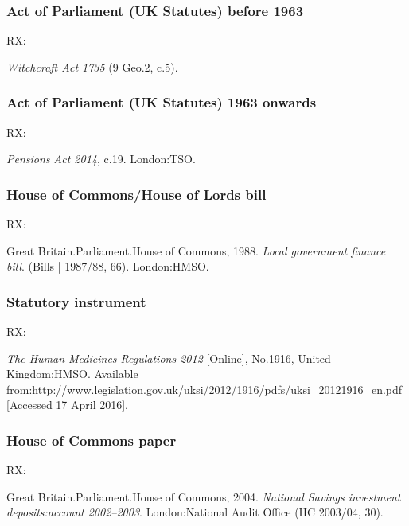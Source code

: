 
\subsubsection*{Act of Parliament (UK Statutes) before 1963}

RX: \cite{gb.wa1735}

\emph{Witchcraft Act 1735} (9 Geo.2, c.5).



\subsubsection*{Act of Parliament (UK Statutes) 1963 onwards}

RX: \cite{gb.pa2014}

\emph{Pensions Act 2014}, c.19. London:\@ TSO.



\subsubsection*{House of Commons/House of Lords bill}

RX: \cite{gb.bill1987/88-66}

Great Britain.\@ Parliament.\@ House of Commons, 1988. \emph{Local government finance bill}. (Bills | 1987/88, 66). London:\@ HMSO.




\subsubsection*{Statutory instrument}

RX: \cite{gb.hmr2012}

\emph{The Human Medicines Regulations 2012} [Online], No.1916, United Kingdom:\@ HMSO. Available from:\@ \url{http://www.legislation.gov.uk/uksi/2012/1916/pdfs/uksi_20121916_en.pdf} [Accessed 17 April 2016].




\subsubsection*{House of Commons paper}

RX: \cite{gb.hc2003/04-30}

Great Britain.\@ Parliament.\@ House of Commons, 2004. \emph{National Savings investment deposits:\@ account 2002--2003}. London:\@ National Audit Office (HC 2003/04, 30).



